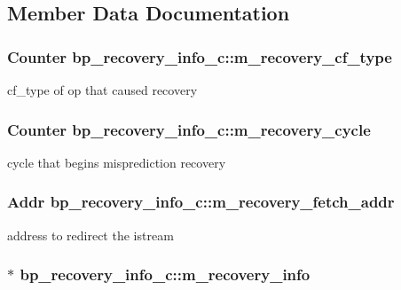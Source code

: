 \subsection{Member Data Documentation}
\hypertarget{classbp__recovery__info__c_afdb299ba15294f1f1681f8e363ffcdbd}{
\subsubsection[{m\_\-recovery\_\-cf\_\-type}]{\setlength{\rightskip}{0pt plus 5cm}Counter {\bf bp\_\-recovery\_\-info\_\-c::m\_\-recovery\_\-cf\_\-type}}}
\label{classbp__recovery__info__c_afdb299ba15294f1f1681f8e363ffcdbd}
cf\_\-type of op that caused recovery \hypertarget{classbp__recovery__info__c_a00230943e8204144e777bd49d036f9df}{
\subsubsection[{m\_\-recovery\_\-cycle}]{\setlength{\rightskip}{0pt plus 5cm}Counter {\bf bp\_\-recovery\_\-info\_\-c::m\_\-recovery\_\-cycle}}}
\label{classbp__recovery__info__c_a00230943e8204144e777bd49d036f9df}
cycle that begins misprediction recovery \hypertarget{classbp__recovery__info__c_a6dfab69054850067ef95b38faf85cec1}{
\subsubsection[{m\_\-recovery\_\-fetch\_\-addr}]{\setlength{\rightskip}{0pt plus 5cm}Addr {\bf bp\_\-recovery\_\-info\_\-c::m\_\-recovery\_\-fetch\_\-addr}}}
\label{classbp__recovery__info__c_a6dfab69054850067ef95b38faf85cec1}
address to redirect the istream \hypertarget{classbp__recovery__info__c_a8addc9c062b96ddfdec35d817d215117}{
\subsubsection[{m\_\-recovery\_\-info}]{$\ast$ {\bf bp\_\-recovery\_\-info\_\-c::m\_\-recovery\_\-info}}}
